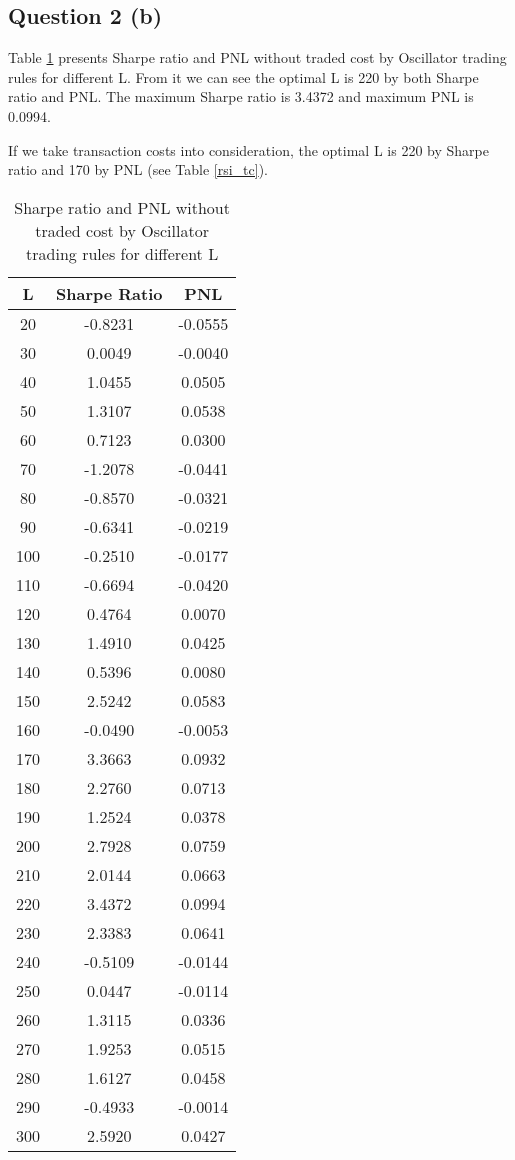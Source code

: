 \documentclass[11pt]{article}
\begin{document}
\subsection{Question 2 (b)}

Table \ref{rsi_notc} presents Sharpe ratio and PNL without traded cost by Oscillator trading rules for different L. From it we can see the optimal L is 220 by both Sharpe ratio and PNL. The maximum Sharpe ratio is 3.4372 and maximum PNL is 0.0994.

If we take transaction costs into consideration, the optimal L is 220 by Sharpe ratio and 170 by PNL (see Table \ref{rsi_tc}).
\begin{table}[ht]
\centering
\begin{tabular}{ccc}
  \hline
L & Sharpe Ratio & PNL \\ 
  \hline
   20 & -0.8231 & -0.0555 \\ 
     30 & 0.0049 & -0.0040 \\ 
     40 & 1.0455 & 0.0505 \\ 
     50 & 1.3107 & 0.0538 \\ 
     60 & 0.7123 & 0.0300 \\ 
     70 & -1.2078 & -0.0441 \\ 
     80 & -0.8570 & -0.0321 \\ 
     90 & -0.6341 & -0.0219 \\ 
    100 & -0.2510 & -0.0177 \\ 
    110 & -0.6694 & -0.0420 \\ 
    120 & 0.4764 & 0.0070 \\ 
    130 & 1.4910 & 0.0425 \\ 
    140 & 0.5396 & 0.0080 \\ 
    150 & 2.5242 & 0.0583 \\ 
    160 & -0.0490 & -0.0053 \\ 
    170 & 3.3663 & 0.0932 \\ 
    180 & 2.2760 & 0.0713 \\ 
    190 & 1.2524 & 0.0378 \\ 
    200 & 2.7928 & 0.0759 \\ 
    210 & 2.0144 & 0.0663 \\ 
    220 & 3.4372 & 0.0994 \\ 
    230 & 2.3383 & 0.0641 \\ 
    240 & -0.5109 & -0.0144 \\ 
    250 & 0.0447 & -0.0114 \\ 
    260 & 1.3115 & 0.0336 \\ 
    270 & 1.9253 & 0.0515 \\ 
    280 & 1.6127 & 0.0458 \\ 
    290 & -0.4933 & -0.0014 \\ 
    300 & 2.5920 & 0.0427 \\ 
   \hline
\end{tabular}
\caption{Sharpe ratio and PNL without traded cost by Oscillator trading rules for different L}\label{rsi_notc}
\end{table}
\end{document}
